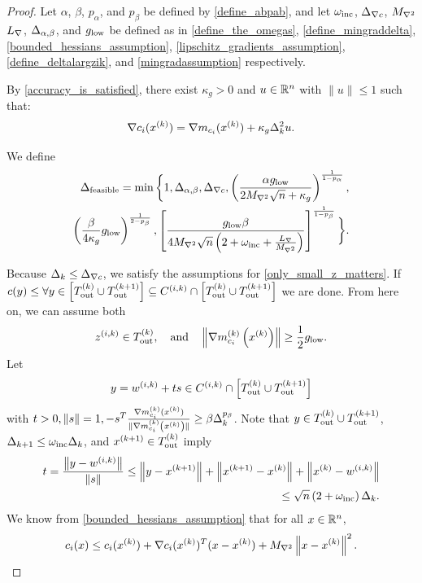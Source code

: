 \begin{proof}
Let
$\alpha$, $\beta$, $p_{\alpha}$, and $p_{\beta}$
be defined by
\cref{define_abpab},
and let
$\omega_{\text{inc}}$,
${\Delta_{\nabla c}}$,
${M_{\nabla^2}}$
${L_{\nabla}}$,
${\Delta_{\alpha,\beta}}$,
and ${ g_{\textrm{low}} }$
be defined as in
\cref{define_the_omegas},
\cref{define_mingraddelta},
\cref{bounded_hessians_assumption},
\cref{lipschitz_gradients_assumption},
\cref{define_deltalargzik},
and \cref{mingradassumption}
respectively.

By \cref{accuracy_is_satisfied}, there exist $\kappa_g > 0$ and $u\in\mathbb R^n$ with $\|u\|\le 1$ such that:
\begin{align}
\nabla c_i(x^{(k)}) = \nabla m_{c_i}(x^{(k)}) + \kappa_g\Delta_k^2 u. \label{model_error_for_gradient}
\end{align}

We define
\begin{align}
{\Delta_{\textrm{feasible}}} = \min\bigg\{
1,{\Delta_{\alpha,\beta}},
{\Delta_{\nabla c}},
\left(\frac{\alpha { g_{\textrm{low}} }}{2 {M_{\nabla^2}} \sqrt{n} + \kappa_g}\right)^{\frac 1 {1-p_{\alpha}}}, \nonumber \\
\left(\frac{\beta}{4\kappa_g}{ g_{\textrm{low}} }\right)^{\frac 1 {2 - p_{\beta}}}, 
\left[\frac {{ g_{\textrm{low}} }  \beta} {4{M_{\nabla^2}}\sqrt{n}\left(2 + \omega_{\text{inc}} + \frac {{L_{\nabla}}} {{M_{\nabla^2}}} \right)}\right]^{\frac1 {1 - p_{\beta}} }
\bigg\}. \label{define_delta_feasible}
\end{align}



Because $\Delta_k \le {\Delta_{\nabla c}}$, we satisfy the assumptions for \cref{only_small_z_matters}.
If $c(y) \le \forall y \in \left[{T_{\text{out}}^{(k)}} \cup {T_{\text{out}}^{(k+1)}}\right] \subseteq {C^{(i, k)}} \cap \left[{T_{\text{out}}^{(k)}} \cup {T_{\text{out}}^{(k+1)}}\right]$ we are done.
From here on, we can assume both
\begin{align}
{z^{(i, k)}} \in {T_{\text{out}}^{(k)}}, \quad \textrm{and} \quad \left\|{\nabla m_{c_i}^{(k)}\left(x^{(k)}\right)}\right\| \ge \frac 1 2 { g_{\textrm{low}} }. \label{z_is_active}
\end{align}
Let
\begin{align}
y = {w^{(i, k)}} + ts \in {C^{(i, k)}} \cap \left[{T_{\text{out}}^{(k)}} \cup {T_{\text{out}}^{(k+1)}}\right] \label{t_is_bounded}
\end{align}
with $t > 0, \|s\| = 1, -s^T{\frac{\nabla m^{(k)}_{c_i}(x^{(k)})}{\|\nabla m^{(k)}_{c_i}\left(x^{(k)}\right)\|}} \ge \beta \Delta_k^{p_{\beta}}$.
Note that $y \in {T_{\text{out}}^{(k)}} \cup {T_{\text{out}}^{(k+1)}}$, $\Delta_{k+1} \le \omega_{\text{inc}}\Delta_k$, and ${{x}^{(k+1)}} \in {T_{\text{out}}^{(k)}}$ imply
\begin{align}
\label{eccif_bound_t}
t = \frac{\left\|y - {w^{(i, k)}}\right\|}{\left\|s\right\|} 
\le \left\|y - {{x}^{(k+1)}}\right\| + \left\|{{x}^{(k+1)}} - x^{(k)}\right\| + \left\|x^{(k)} - {w^{(i, k)}}\right\| \\
\le \sqrt{n}\left(2 + \omega_{\text{inc}} \right)\Delta_k.
\end{align}
We know from \cref{bounded_hessians_assumption} that for all $x \in \mathbb R^n$,
\begin{align}
c_i(x) \le c_i(x^{(k)}) + \nabla c_i(x^{(k)})^T(x - x^{(k)}) + {M_{\nabla^2}} \left \|x - x^{(k)} \right\|^2. \label{constraint_lower_bound}
\end{align}


\end{proof}
